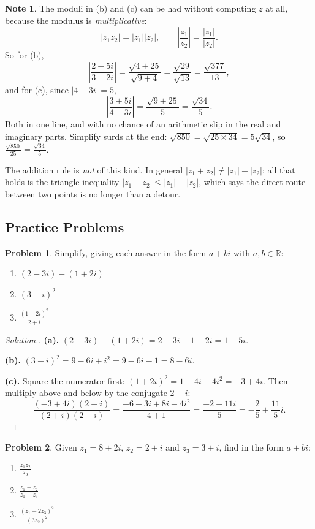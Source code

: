 \documentclass[11pt,a4paper]{article}
\theoremstyle{definition}
\newtheorem{note}[thm]{Note}
\newtheorem{problemx}{Problem}[section]
\newenvironment{problem}{\begin{problemx}}{\end{problemx}}
\newenvironment{solution}
  {\renewcommand{\qedsymbol}{}\begin{proof}[\textit{Solution}.]}
  {\end{proof}}
\begin{document}
\begin{note}
The moduli in (b) and (c) can be had without computing $z$ at all, because the
modulus is \emph{multiplicative}:
$$\left|z_1z_2\right|=\left|z_1\right|\left|z_2\right|,
\qquad \left|\frac{z_1}{z_2}\right|=\frac{\left|z_1\right|}{\left|z_2\right|} .$$
So for (b),
$$\left|\frac{2-5i}{3+2i}\right|=\frac{\sqrt{4+25}}{\sqrt{9+4}}
=\frac{\sqrt{29}}{\sqrt{13}}=\frac{\sqrt{377}}{13},$$
and for (c), since $\left|4-3i\right|=5$,
$$\left|\frac{3+5i}{4-3i}\right|=\frac{\sqrt{9+25}}{5}=\frac{\sqrt{34}}{5} .$$
Both in one line, and with no chance of an arithmetic slip in the real and
imaginary parts. Simplify surds at the end: $\sqrt{850}=\sqrt{25\times 34}
=5\sqrt{34}$, so $\frac{\sqrt{850}}{25}=\frac{\sqrt{34}}{5}$.

The addition rule is \emph{not} of this kind. In general
$\left|z_1+z_2\right|\neq\left|z_1\right|+\left|z_2\right|$; all that holds is the
triangle inequality $\left|z_1+z_2\right|\leq\left|z_1\right|+\left|z_2\right|$,
which says the direct route between two points is no longer than a detour.
\end{note}
\pagebreak

\subsection{Practice Problems}

\begin{problem}
Simplify, giving each answer in the form $a+bi$ with $a,b\in\mathbb{R}$:
\begin{enumerate}
\item[(a).] $(2-3i)-(1+2i)$
\item[(b).] $(3-i)^{2}$
\item[(c).] $\frac{(1+2i)^{2}}{2+i}$
\end{enumerate}
\end{problem}

\begin{solution}
\textbf{(a).} $(2-3i)-(1+2i)=2-3i-1-2i=1-5i$.

\textbf{(b).} $(3-i)^{2}=9-6i+i^{2}=9-6i-1=8-6i$.

\textbf{(c).} Square the numerator first:
$(1+2i)^{2}=1+4i+4i^{2}=-3+4i$. Then multiply above and below by the conjugate
$2-i$:
$$\frac{(-3+4i)(2-i)}{(2+i)(2-i)}=\frac{-6+3i+8i-4i^{2}}{4+1}
=\frac{-2+11i}{5}=-\frac{2}{5}+\frac{11}{5}i .$$
\end{solution}

\begin{problem}
Given $z_1=8+2i$, $z_2=2+i$ and $z_3=3+i$, find in the form $a+bi$:
\begin{enumerate}
\item[(a).] $\frac{z_1z_2}{z_3}$
\item[(b).] $\frac{z_1-z_2}{z_1+z_3}$
\item[(c).] $\frac{\left(z_1-2z_3\right)^{2}}{\left(3z_2\right)^{2}}$
\end{enumerate}
\end{problem}
\end{document}

